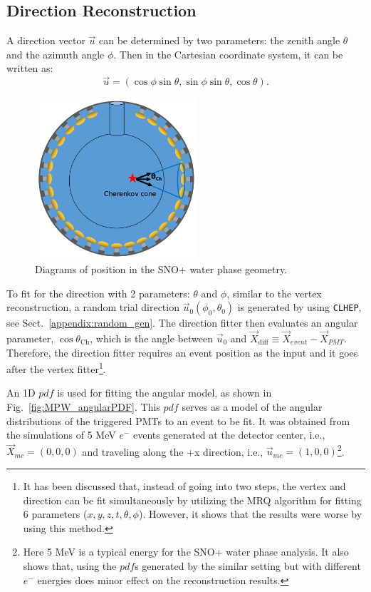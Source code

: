 \subsection{Direction Reconstruction}\label{sect:waterDirection}
A direction vector $\vec{u}$ can be determined by two parameters: the zenith angle $\theta$ and the azimuth angle $\phi$. Then in the Cartesian coordinate system, it can be written as: 
\begin{equation}
\vec{u}=(\cos\phi\sin\theta,\sin\phi\sin\theta,\cos\theta).
\end{equation}

\begin{figure}[htbp]
	\centering
	\includegraphics[width=6cm]{mpwDiagram2.png}
	\caption{Diagrams of position in the SNO+ water phase geometry.}
	\label{mpwdiagram_direction}
\end{figure}
To fit for the direction with 2 parameters: $\theta$ and $\phi$, similar to the vertex reconstruction, a random trial direction $\vec{u}_0(\phi_0,\theta_0)$ is generated by using \texttt{CLHEP}, see Sect.~\ref{appendix:random_gen}. The direction fitter then evaluates an angular parameter, $\cos\theta_{\mathrm{Ch}}$, which is the angle between $\vec{u}_{0}$ and $\vec{X}_{{\mathrm{diff}}}\equiv \vec{X}_{event}-\vec{X}_{PMT}$. Therefore, the direction fitter requires an event position as the input and it goes after the vertex fitter\footnote{It has been discussed that, instead of going into two steps, the vertex and direction can be fit simultaneously by utilizing the MRQ algorithm for fitting 6 parameters ($x,y,z,t,\theta,\phi$). However, it shows that the results were worse by using this method.}.

An 1D $pdf$ is used for fitting the angular model, as shown in Fig.~\ref{fig:MPW_angularPDF}. This $pdf$ serves as a model of the angular distributions of the triggered PMTs to an event to be fit. It was obtained from the simulations of 5 MeV $e^-$ events generated at the detector center, i.e., $\vec{X}_{mc}=(0,0,0)$ and traveling along the +x direction, i.e., $\vec{u}_{mc}=(1,0,0)$\footnote{Here 5 MeV is a typical energy for the SNO+ water phase analysis. It also shows that, using the $pdf$s generated by the similar setting but with different $e^-$ energies does minor effect on the reconstruction results.}.

